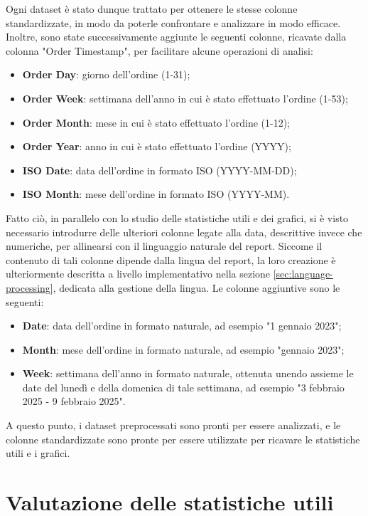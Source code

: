 Ogni dataset è stato dunque trattato per ottenere le stesse colonne standardizzate, in modo da poterle confrontare e analizzare in modo efficace.
Inoltre, sono state successivamente aggiunte le seguenti colonne, ricavate dalla colonna "Order Timestamp", per facilitare alcune operazioni di analisi:
\begin{itemize}
    \item \textbf{Order Day}: giorno dell'ordine (1-31);
    \item \textbf{Order Week}: settimana dell'anno in cui è stato effettuato l'ordine (1-53);
    \item \textbf{Order Month}: mese in cui è stato effettuato l'ordine (1-12);
    \item \textbf{Order Year}: anno in cui è stato effettuato l'ordine (YYYY);
    \item \textbf{ISO Date}: data dell'ordine in formato ISO (YYYY-MM-DD);
    \item \textbf{ISO Month}: mese dell'ordine in formato ISO (YYYY-MM).
\end{itemize}

Fatto ciò, in parallelo con lo studio delle statistiche utili e dei grafici, si è visto necessario introdurre delle ulteriori colonne legate alla data, descrittive invece che numeriche, per allinearsi con il linguaggio naturale del report. Siccome il contenuto di tali colonne dipende dalla lingua del report, la loro creazione è ulteriormente descritta a livello implementativo nella sezione \ref{sec:language-processing}, dedicata alla gestione della lingua. Le colonne aggiuntive sono le seguenti:
\begin{itemize}
    \item \textbf{Date}: data dell'ordine in formato naturale, ad esempio "1 gennaio 2023";
    \item \textbf{Month}: mese dell'ordine in formato naturale, ad esempio "gennaio 2023";
    \item \textbf{Week}: settimana dell'anno in formato naturale, ottenuta unendo assieme le date del lunedì e della domenica di tale settimana, ad esempio "3 febbraio 2025 - 9 febbraio 2025".
\end{itemize}

A questo punto, i dataset preprocessati sono pronti per essere analizzati, e le colonne standardizzate sono pronte per essere utilizzate per ricavare le statistiche utili e i grafici.



\section{Valutazione delle statistiche utili}

